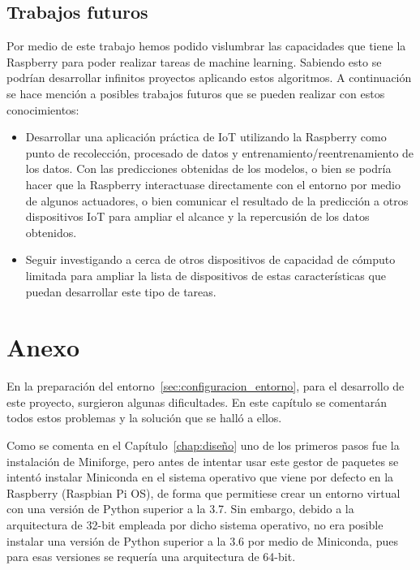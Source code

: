 \documentclass[a4paper, 12pt]{book}
\begin{document}
\section{Trabajos futuros}
\label{sec:trabajos_futuros}

Por medio de este trabajo hemos podido vislumbrar las capacidades que tiene la Raspberry para poder realizar tareas de machine learning. Sabiendo esto se podrían desarrollar infinitos proyectos aplicando estos algoritmos. A continuación se hace mención a posibles trabajos futuros que se pueden realizar con estos conocimientos:

\begin{itemize}
    \item Desarrollar una aplicación práctica de IoT utilizando la Raspberry como punto de recolección, procesado de datos y entrenamiento/reentrenamiento de los datos. Con las predicciones obtenidas de los modelos, o bien se podría hacer que la Raspberry interactuase directamente con el entorno por medio de algunos actuadores, o bien comunicar el resultado de la predicción a otros dispositivos IoT para ampliar el alcance y la repercusión de los datos obtenidos.
    
    \item Seguir investigando a cerca de otros dispositivos de capacidad de cómputo limitada para ampliar la lista de dispositivos de estas características que puedan desarrollar este tipo de tareas.
\end{itemize}

\chapter{Anexo}
\label{chap:anexo}

En la preparación del entorno~\ref{sec:configuracion_entorno}, para el desarrollo de este proyecto, surgieron algunas dificultades. En este capítulo se comentarán todos estos problemas y la solución que se halló a ellos.

Como se comenta en el Capítulo~\ref{chap:diseño} uno de los primeros pasos fue la instalación de Miniforge, pero antes de intentar usar este gestor de paquetes se intentó instalar Miniconda en el sistema operativo que viene por defecto en la Raspberry (Raspbian Pi OS), de forma que permitiese crear un entorno virtual con una versión de Python superior a la 3.7. Sin embargo, debido a la arquitectura de 32-bit empleada por dicho sistema operativo, no era posible instalar una versión de Python superior a la 3.6 por medio de Miniconda, pues para esas versiones se requería una arquitectura de 64-bit.
\end{document}
